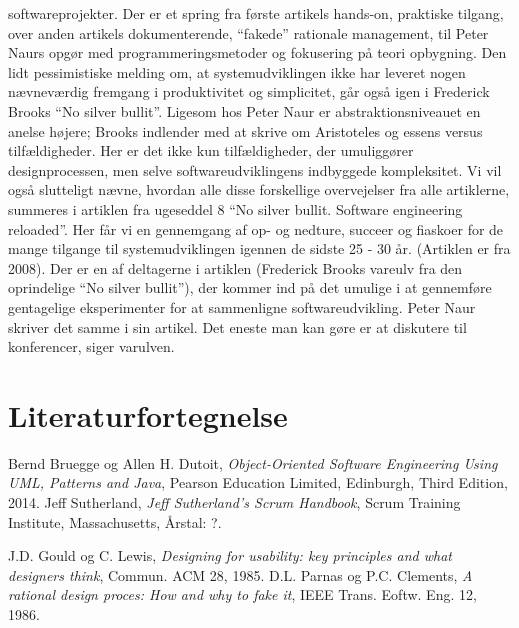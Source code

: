 \documentclass[12pt]{article}   %
\begin{document}
softwareprojekter. Der er et spring fra første artikels hands-on, praktiske
tilgang, over anden artikels dokumenterende, ``fakede'' rationale management,
til Peter Naurs opgør med programmeringsmetoder og fokusering på teori
opbygning. 
Den lidt pessimistiske melding om, at systemudviklingen ikke har
leveret nogen nævneværdig fremgang i produktivitet og simplicitet, går også igen
i Frederick Brooks ``No silver bullit''.
Ligesom hos Peter Naur er abstraktionsniveauet en anelse højere; Brooks
indlender med at skrive om Aristoteles og essens versus tilfældigheder. Her er 
det ikke kun tilfældigheder, der umuliggører designprocessen, men selve
softwareudviklingens indbyggede kompleksitet. Vi vil også slutteligt nævne,
hvordan alle disse forskellige overvejelser fra alle artiklerne, summeres i
artiklen fra ugeseddel 8 ``No silver bullit. Software engineering reloaded''.
Her får vi en gennemgang af op-
og nedture, succeer og fiaskoer for de mange tilgange til systemudviklingen
igennen de sidste 25 - 30 år. (Artiklen er fra 2008). Der er en af deltagerne
i artiklen (Frederick Brooks vareulv fra den oprindelige ``No silver bullit''), 
der kommer ind på det umulige i at gennemføre gentagelige eksperimenter for at
sammenligne softwareudvikling. Peter Naur skriver det samme i sin artikel.
Det eneste man kan gøre er at diskutere til konferencer, siger varulven. 




\pagebreak

\section{Literaturfortegnelse}
\begin{thebibliography}{9}
		Bernd Bruegge og Allen H. Dutoit,
		\emph{Object-Oriented Software Engineering Using UML, Patterns
		and Java},
		Pearson Education Limited, Edinburgh,
		Third Edition,
		2014.
		Jeff Sutherland,
		\emph{Jeff Sutherland's Scrum Handbook},
		Scrum Training Institute, Massachusetts,
		Årstal: ?.

		J.D. Gould og C. Lewis, 
	\emph{Designing for usability: key principles and what designers
	think},
	Commun. ACM 28,
	1985.
	D.L. Parnas og P.C. Clements,
	\emph{A rational design proces: How and why to fake it},
	IEEE Trans. Eoftw. Eng. 12,
	1986.
\end{thebibliography}
\end{document}
